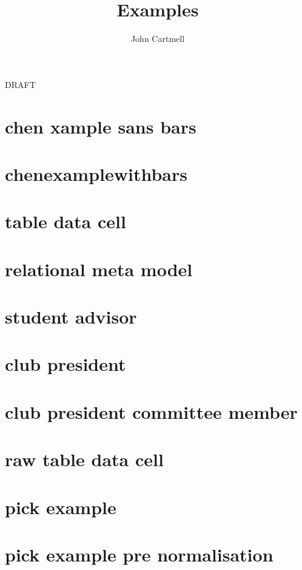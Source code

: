 \documentclass[10pt,a4paper]{article}
\begin{document}
\title{Examples}


\author{John Cartmell}

\maketitle
\begin{center}
DRAFT
\end{center}

\section{chen xample sans bars}


\section{chenexamplewithbars}


\section{table data cell}


\section{relational meta model}


\section{student advisor}


\section{club president}


\section{club president committee member}


\section{raw table data cell}


\section{pick example}


\section{pick example pre normalisation}


	 
\end{document}
